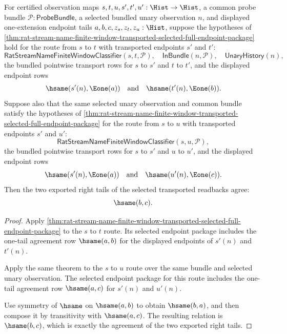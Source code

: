 \begin{theorem}
\label{thm:streamname-two-route-selected-endpoint-agreement}
For certified observation maps $s,t,u,s',t',u':\Hist\to\Hist$, a common probe
bundle $\mathcal{P}:\mathsf{ProbeBundle}$, a selected bundled unary
observation $n$, and displayed one-extension endpoint tails
$a,b,c,z_s,z_t,z_u:\Hist$, suppose the hypotheses of
\autoref{thm:rat-stream-name-finite-window-transported-selected-full-endpoint-package}
hold for the route from $s$ to $t$ with transported endpoints $s'$ and $t'$:
$$
\mathsf{RatStreamNameFiniteWindowClassifier}(s,t,\mathcal{P}),
\quad
\mathsf{InBundle}(n,\mathcal{P}),
\quad
\mathsf{UnaryHistory}(n),
$$
the bundled pointwise transport rows for $s$ to $s'$ and $t$ to $t'$, and the
displayed endpoint rows
$$
\hsame(s'(n),\Eone(a))\quad\text{and}\quad
\hsame(t'(n),\Eone(b)).
$$
Suppose also that the same selected unary observation and common bundle satisfy
the hypotheses of
\autoref{thm:rat-stream-name-finite-window-transported-selected-full-endpoint-package}
for the route from $s$ to $u$ with transported endpoints $s'$ and $u'$:
$$
\mathsf{RatStreamNameFiniteWindowClassifier}(s,u,\mathcal{P}),
$$
the bundled pointwise transport rows for $s$ to $s'$ and $u$ to $u'$, and the
displayed endpoint rows
$$
\hsame(s'(n),\Eone(a))\quad\text{and}\quad
\hsame(u'(n),\Eone(c)).
$$
Then the two exported right tails of the selected transported readbacks agree:
$$
\hsame(b,c).
$$
\end{theorem}
\begin{proof}
Apply
\autoref{thm:rat-stream-name-finite-window-transported-selected-full-endpoint-package}
to the $s$ to $t$ route. Its selected endpoint package includes the
one-tail agreement row $\hsame(a,b)$ for the displayed endpoints of $s'(n)$
and $t'(n)$.

Apply the same theorem to the $s$ to $u$ route over the same bundle and
selected unary observation. The selected endpoint package for this route
includes the one-tail agreement row $\hsame(a,c)$ for $s'(n)$ and $u'(n)$.

Use symmetry of $\hsame$ on $\hsame(a,b)$ to obtain $\hsame(b,a)$, and then
compose it by transitivity with $\hsame(a,c)$. The resulting relation is
$\hsame(b,c)$, which is exactly the agreement of the two exported right tails.
\end{proof}

